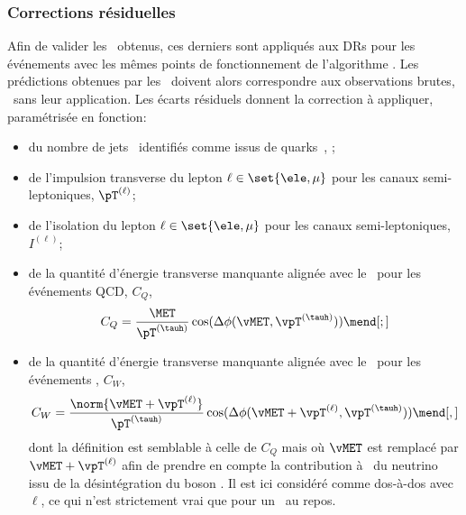 \subsubsection{Corrections résiduelles}
Afin de valider les \fakefactors\ obtenus, ces derniers sont appliqués aux DRs pour les événements avec les mêmes points de fonctionnement de l'algorithme \DEEPTAU.
Les prédictions obtenues par les \fakefactors\ doivent alors correspondre aux observations brutes, \ie\ sans leur application.
Les écarts résiduels donnent la correction à appliquer, paramétrisée en fonction:
\begin{itemize}
\item du nombre de jets \Nprebjets\ identifiés comme issus de quarks~\quarkb, \Nbjets;
\item de l'impulsion transverse du lepton $\ell\in\set{\ele,\mu}$ pour les canaux semi-leptoniques, $\pT^{(\ell)}$;
\item de l'isolation du lepton $\ell\in\set{\ele,\mu}$ pour les canaux semi-leptoniques, $I^{(\ell)}$;
\item de la quantité d'énergie transverse manquante alignée avec le \tauh\ pour les événements QCD, $C_Q$,
\begin{equation}
C_Q = \frac{\MET}{\pT^{(\tauh)}} \cos(\Delta\phi(\vMET, \vpT^{(\tauh)}))
\mend[;]
\label{eq-FF_CQ_def}
\end{equation}
\item de la quantité d'énergie transverse manquante alignée avec le \tauh\ pour les événements \Wjets, $C_W$,
\begin{equation}
C_W = \frac{\norm{\vMET + \vpT^{(\ell)}}}{\pT^{(\tauh)}} \cos(\Delta\phi(\vMET + \vpT^{(\ell)}, \vpT^{(\tauh)}))
\mend[,]
\label{eq-FF_CW_def}
\end{equation}
dont la définition est semblable à celle de $C_Q$ mais où $\vMET$ est remplacé par $\vMET + \vpT^{(\ell)}$ afin de prendre en compte la contribution à \MET\ du neutrino issu de la désintégration du boson \Wboson.
Il est ici considéré comme dos-à-dos avec $\ell$, ce qui n'est strictement vrai que pour un \Wboson\ au repos.
\end{itemize}

